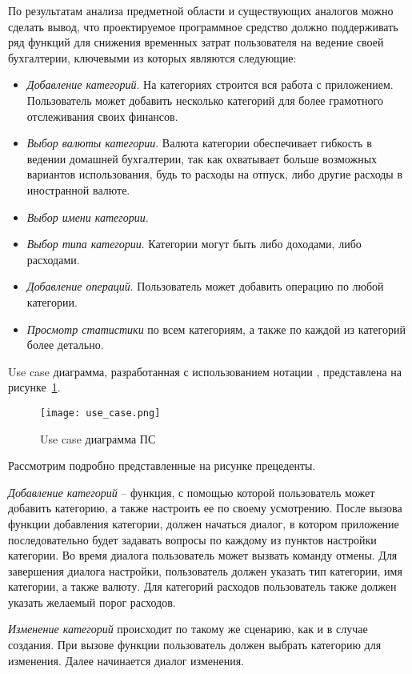 По результатам анализа предметной области и существующих аналогов можно сделать вывод, что проектируемое программное средство должно поддерживать ряд функций для снижения временных затрат пользователя на ведение своей бухгалтерии, ключевыми из которых являются следующие:

\begin{itemize}
	\item \emph{Добавление категорий}. На категориях строится вся работа с приложением. Пользователь может добавить несколько категорий для более грамотного отслеживания своих финансов.
	\item \emph{Выбор валюты категории}. Валюта категории обеспечивает гибкость в ведении домашней бухгалтерии, так как охватывает больше возможных вариантов использования, будь то расходы на отпуск, либо другие расходы в иностранной валюте.
	\item \emph{Выбор имени категории}.
	\item \emph{Выбор типа категории}. Категории могут быть либо доходами, либо расходами.
	\item \emph{Добавление операций}. Пользователь может добавить операцию по любой категории. 
	\item \emph{Просмотр статистики} по всем категориям, а также по каждой из категорий более детально.
\end{itemize}

Use case диаграмма, разработанная с использованием нотации \uml, представлена на рисунке~\ref{fig:domain:model:use_cases:model}.

\begin{figure}[!h]
\centering
	\texttt{[image: use\_case.png]}
	\caption{Use case диаграмма ПС}
	\label{fig:domain:model:use_cases:model}
\end{figure}

Рассмотрим подробно представленные на рисунке прецеденты.

\emph{Добавление категорий} -- функция, с помощью которой пользователь может добавить категорию, а также настроить ее по своему усмотрению. После вызова функции добавления категории, должен начаться диалог, в котором приложение последовательно будет задавать вопросы по каждому из пунктов настройки категории. Во время диалога пользователь может вызвать команду отмены. Для завершения диалога настройки, пользователь должен указать тип категории, имя категории, а также валюту. Для категорий расходов пользователь также должен указать желаемый порог расходов.

\emph{Изменение категорий} происходит по такому же сценарию, как и в случае создания. При вызове функции пользователь должен выбрать категорию для изменения. Далее начинается диалог изменения.

